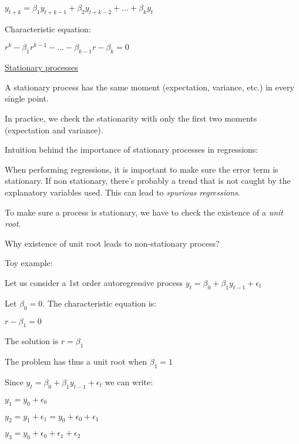 $y_{t+k} = \beta_1 y_{t+k-1} + \beta_2 y_{t+k-2} + ... + \beta_k y_{t}$

\vspace{5mm}

Characteristic equation:

$r^k - \beta_1 r^{k-1} - ... - \beta_{k-1} r - \beta_k = 0$

\vspace{5mm}

\underline{Stationary processes}

\vspace{5mm}

A stationary process has the same moment (expectation, variance, etc.)  in every single point.

In practice, we check the stationarity with only the first two moments (expectation and variance).

\vspace{5mm}

Intuition behind the importance of stationary processes in regressions:

When performing regressions, it is important to make sure the error term is stationary. If non stationary, there's probably a trend that is not caught by the explanatory variables used. This can lead to \textit{spurious regressions}.

\vspace{5mm}

To make sure a process is stationary, we have to check the existence of a \textit{unit root}.

\vspace{5mm}

Why existence of unit root leads to non-stationary process?

Toy example:

Let us consider a 1st order autoregressive process $y_t = \beta_0 + \beta_1 y_{t-1} + \epsilon_t$

Let $\beta_0 = 0$. The characteristic equation is:

$r - \beta_1 = 0$

The solution is $r = \beta_1$

The problem has thus a unit root when $\beta_1 = 1$

Since $y_t = \beta_0 + \beta_1 y_{t-1} + \epsilon_t$ we can write:

$y_1 = y_0 + \epsilon_0$

$y_2 = y_1 + \epsilon_1 = y_0 + \epsilon_0 + \epsilon_1$

$y_3 = y_0 + \epsilon_0 + \epsilon_1 + \epsilon_2$

